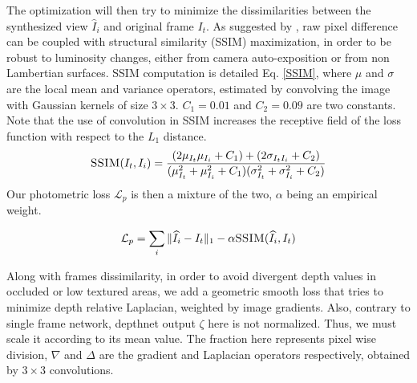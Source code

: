\documentclass[runningheads]{llncs}
\begin{document}
The optimization will then try to minimize the dissimilarities between the synthesized view $\widehat{I}_i$ and original frame $I_t$. As suggested by \cite{monodepth17}, raw pixel difference can be coupled with structural similarity (SSIM) \cite{wang2004image} maximization, in order to be robust to luminosity changes, either from camera auto-exposition or from non Lambertian surfaces. SSIM computation is detailed Eq. \ref{SSIM}, where $\mu$ and $\sigma$ are the local mean and variance operators, estimated by convolving
the image with Gaussian kernels of size $3 \times 3$.
$C_1 = 0.01$ and $C_2 = 0.09$ are two constants.
Note that the use of convolution in SSIM increases the receptive field of the loss function with respect to the $L_1$ distance.
\begin{equation}
\label{SSIM}
 \textsc{SSIM}(I_t, I_i) = \frac{(2\mu_{I_t}\mu_{I_i} + C_1) + (2 \sigma _{I_tI_i} + C_2)}
    {(\mu_{I_t}^2 + \mu_{I_i}^2+C_1) (\sigma_{I_t}^2 + \sigma_{I_i}^2+C_2)}
\end{equation}
Our photometric loss $\mathcal{L}_p$ is then a mixture of the two, $\alpha$ being an empirical weight.

\begin{equation}
\mathcal{L}_p = \sum_i \Vert \widehat{I}_i - I_t\Vert_1 - \alpha \textsc{SSIM}(\widehat{I}_i, I_t)
\end{equation}

Along with frames dissimilarity, in order to avoid divergent depth values in occluded or low textured areas, we add a geometric smooth loss that tries to minimize depth relative Laplacian, weighted by image gradients. Also, contrary to single frame network, depthnet output $\zeta$ here is not normalized. Thus, we must scale it according to its mean value. The fraction here represents pixel wise division, $\nabla$ and $\Delta$ are the gradient and Laplacian operators respectively, obtained by $3\times3$ convolutions.
\end{document}
